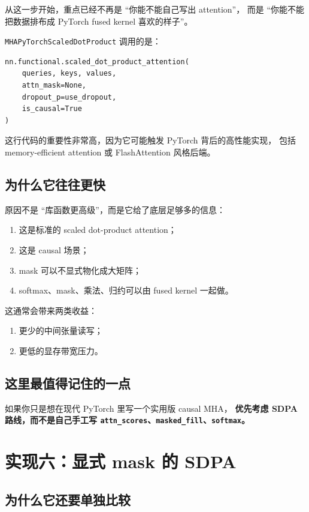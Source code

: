 \documentclass[12pt,a4paper]{ctexart}
\newcommand{\code}[1]{\texttt{#1}}
\begin{document}
从这一步开始，重点已经不再是 ``你能不能自己写出 attention''，
而是 ``你能不能把数据排布成 PyTorch fused kernel 喜欢的样子''。

\code{MHAPyTorchScaledDotProduct} 调用的是：

\begin{lstlisting}[style=py]
nn.functional.scaled_dot_product_attention(
    queries, keys, values,
    attn_mask=None,
    dropout_p=use_dropout,
    is_causal=True
)
\end{lstlisting}

这行代码的重要性非常高，因为它可能触发 PyTorch 背后的高性能实现，
包括 memory-efficient attention 或 FlashAttention 风格后端。

\subsection{为什么它往往更快}

原因不是 ``库函数更高级''，而是它给了底层足够多的信息：

\begin{enumerate}
  \item 这是标准的 scaled dot-product attention；
  \item 这是 causal 场景；
  \item mask 可以不显式物化成大矩阵；
  \item softmax、mask、乘法、归约可以由 fused kernel 一起做。
\end{enumerate}

这通常会带来两类收益：

\begin{enumerate}
  \item 更少的中间张量读写；
  \item 更低的显存带宽压力。
\end{enumerate}

\subsection{这里最值得记住的一点}

如果你只是想在现代 PyTorch 里写一个实用版 causal MHA，
\textbf{优先考虑 SDPA 路线，而不是自己手工写
\code{attn\_scores}、\code{masked\_fill}、\code{softmax}。}

\section{实现六：显式 mask 的 SDPA}

\subsection{为什么它还要单独比较}
\end{document}
